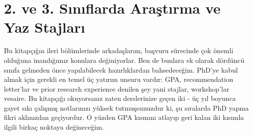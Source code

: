 \documentclass[12pt]{article}
\begin{document}
\section{2. ve 3. Sınıflarda Araştırma ve Yaz Stajları}
Bu kitapçığın ileri bölümlerinde arkadaşlarım, başvuru sürecinde çok önemli olduğuna inandığımız konulara değiniyorlar. Ben de bunlara ek olarak dördüncü sınıfa gelmeden önce yapılabilecek hazırlıklardan bahsedeceğim. PhD’ye kabul almak için gerekli en temel üç yatırım unsuru vardır: GPA, recommendation letter’lar ve prior research experience denilen şey yani stajlar, workshop’lar vesaire. Bu kitapçığı okuyorsanız zaten derslerinize geçen iki - üç yıl boyunca gayet sıkı çalışmış notlarınızı yüksek tutmuşsunuzdur ki, şu sıralarda PhD yapma fikri aklınızdan geçiyordur. O yüzden GPA kısmını atlayıp geri kalan iki kısımla ilgili birkaç noktaya değineceğim.
\end{document}
